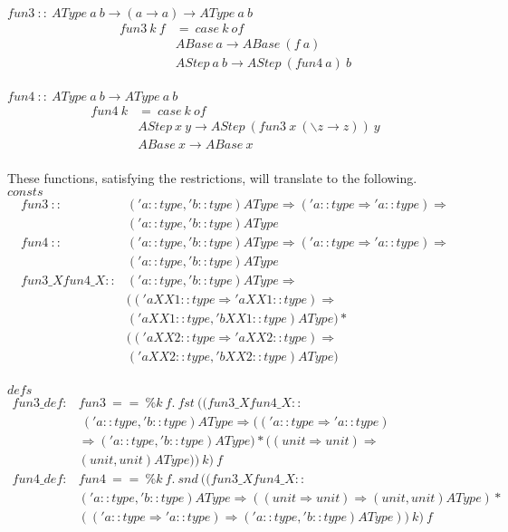 \documentclass[a4paper,12pt]{article}
\begin{document}
\noindent $ fun3 \ :: \ AType \ a \ b \to (a \to a) \to AType \ a \ b $
$$\begin{array}{ll}
fun3 \ k \ f & = \ case \ k \ of \\
  & ABase \ a \to ABase \ (f \ a) \\
  & AStep \ a \ b \to AStep \ (fun4 \ a) \ b \\
\end{array}$$
   
\noindent $ fun4 \ :: \ AType \ a \ b \to AType \ a \ b $
$$\begin{array}{ll}
fun4 \ k & = \ case \ k \ of \\ 
  & AStep \ x \ y \to AStep \ (fun3 \ x \ (\backslash z \to z)) \ y \\
   & ABase \ x \to ABase \ x \\
\end{array}$$

\noindent These functions, satisfying the restrictions, will translate
to the following.\\

\noindent $consts$
$$\begin{array}{ll}
fun3 \ :: & ('a::type, 'b::type) AType \Rightarrow ('a::type \Rightarrow 'a::type) \Rightarrow \\ & ('a::type, 'b::type) AType \\
fun4 \ :: & ('a::type, 'b::type) AType \Rightarrow ('a::type \Rightarrow 'a::type) \Rightarrow\\ & ('a::type, 'b::type) AType \\
fun3\_Xfun4\_X :: & ('a::type, 'b::type) AType \Rightarrow \\ & (('aXX1::type \Rightarrow 'aXX1::type) \Rightarrow \\ & ('aXX1::type, 'bXX1::type) AType) * \\
 & (('aXX2::type \Rightarrow 'aXX2::type) \Rightarrow \\ & ('aXX2::type, 'bXX2::type) AType) \\
\end{array}$$

\noindent $defs$
$$\begin{array}{lll}
fun3\_def : & fun3 \ == \ \% k \ f. \ fst \ (( fun3\_Xfun4\_X ::  \\ 
        & \ ('a::type, 'b::type) AType \Rightarrow (('a::type \Rightarrow 'a::type) \\
& \Rightarrow ('a::type, 'b::type) AType) * ((unit \Rightarrow unit) \Rightarrow \\ & (unit, unit) AType) ) \ k) \ f \\
fun4\_def : & fun4 \ == \ \% k \ f. \ snd \ (( fun3\_Xfun4\_X ::  \\ 
 & ('a::type, 'b::type) AType \Rightarrow ((unit \Rightarrow unit) \Rightarrow (unit, unit) AType) * \\ & (('a::type \Rightarrow 'a::type) \Rightarrow ('a::type, 'b::type) AType) ) \ k) \ f \\
\end{array}$$
\end{document}
